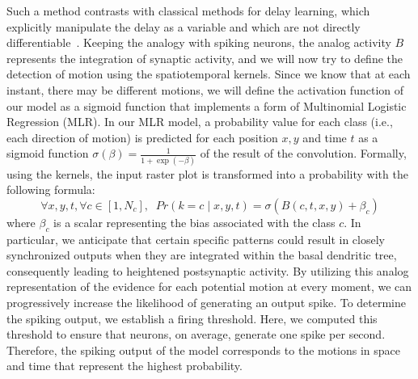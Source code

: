 \documentclass[default]{sn-jnl}%
\theoremstyle{thmstyleone}%
\theoremstyle{thmstyletwo}%
\theoremstyle{thmstylethree}%
\newcommand{\bias}{\beta} %
\newcommand{\timev}{t} %
\newcommand{\class}{c} %
\newcommand{\Nclass}{N_\class} %
\begin{document}
Such a method contrasts with classical methods for delay learning, which explicitly manipulate the delay as a variable and which are not directly differentiable~\citep{nadafian_bio-plausible_2020}. Keeping the analogy with spiking neurons, the analog activity $B$ represents the integration of synaptic activity, and we will now try to define the detection of motion using the spatiotemporal kernels. Since we know that at each instant, there may be different motions, we will define the activation function of our model as a sigmoid function that implements a form of Multinomial Logistic Regression (MLR). In our MLR model, a probability value for each class (i.e., each direction of motion) is predicted for each position $x, y$ and time $\timev$ as a sigmoid function $\sigma(\beta) = \frac {1} {1 + \exp(-\beta)}$ of the result of the convolution. Formally, using the kernels, the input raster plot is transformed into a probability with the following formula:
%
\begin{equation}\label{eq:mlr}
\forall x, y, \timev, \forall \class \in [1, \Nclass], \; \;
Pr(k=\class \; \vert \; x, y, \timev) =
\sigma (B(\class, \timev, x, y) +\bias_\class) 
\end{equation} 
%
where $\bias_\class$ is a scalar representing the bias associated with the class $\class$. In particular, we anticipate that certain specific patterns could result in closely synchronized outputs when they are integrated within the basal dendritic tree, consequently leading to heightened postsynaptic activity. By utilizing this analog representation of the evidence for each potential motion at every moment, we can progressively increase the likelihood of generating an output spike. To determine the spiking output, we establish a firing threshold. Here, we computed this threshold to ensure that neurons, on average, generate one spike per second. Therefore, the spiking output of the model corresponds to the motions in space and time that represent the highest probability.
\end{document}
